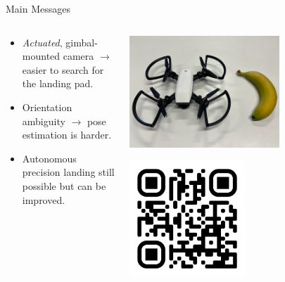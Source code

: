 \documentclass[aspectratio=169]{beamer}
\begin{document}
\begin{frame}{Main Messages}
	\begin{columns}
	\begin{column}{0.6\textwidth}
	\begin{itemize}
		\item \emph{Actuated}, gimbal-mounted camera
			$\rightarrow$ easier to search for the landing pad.
		\item Orientation ambiguity
			$\rightarrow$ pose estimation is harder.
		\item Autonomous precision landing still possible
			but can be improved.
	\end{itemize}
	\end{column}
	\begin{column}{0.5\textwidth}
		\centering

		\vspace*{1cm}
		\includegraphics[width=0.65\textwidth]{./images/dji_spark}

		\includegraphics[width=0.5\textwidth]{./images/qr_uzgit_github_io.png}
	\end{column}
	\end{columns}
\end{frame}

\end{document}
